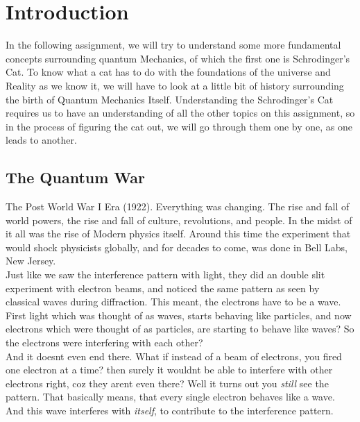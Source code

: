 \documentclass[11pt]{article}
\begin{document}
\tableofcontents
\clearpage

\section{Introduction}
In the following assignment, we will try to understand some more fundamental concepts surrounding quantum Mechanics, of which the first one
is Schrodinger's Cat. To know what a cat has to do with the foundations of the universe and Reality as we know it, we will have to look
at a little bit of history surrounding the birth of Quantum Mechanics Itself. Understanding the Schrodinger's Cat requires us to have an understanding of all the other topics on this assignment, so in the process of figuring the cat out, we will go through them one by one, as one leads to another. 

\subsection{The Quantum War}


The Post World War I Era (1922). Everything was changing. The rise and fall of world powers, the rise and fall of culture, revolutions, and people. In the midst of it all was the rise of Modern physics itself. Around this time the experiment that would shock physicists globally, and for decades to come, was done in Bell Labs, New Jersey.\\

Just like we saw the interference pattern with light, they did an double slit experiment with electron beams, and noticed the same pattern as seen by classical waves during diffraction. This meant, the electrons have to be a wave. First light which was thought of as waves, starts behaving like particles, and now electrons which were thought of as particles, are starting to behave like waves? So the electrons were interfering with each other? \\

And it doesnt even end there. What if instead of a beam of electrons, you fired one electron at a time? then surely it wouldnt be able to interfere with other electrons right, coz they arent even there? Well it turns out you \textit{still} see the pattern. That basically means, that every single electron behaves like a wave. And this wave interferes with \textit{itself}, to contribute to the interference pattern. \\
\end{document}
